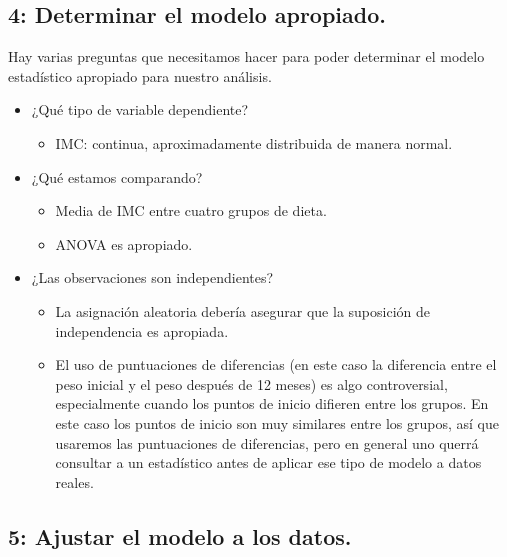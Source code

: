 \documentclass[
  12pt,
]{book}
\providecommand{\tightlist}{%
  \setlength{\itemsep}{0pt}\setlength{\parskip}{0pt}}
\theoremstyle{definition}
\theoremstyle{definition}
\theoremstyle{definition}
\theoremstyle{remark}
\begin{document}
\hypertarget{determinar-el-modelo-apropiado.}{%
\subsection{4: Determinar el modelo apropiado.}\label{determinar-el-modelo-apropiado.}}

Hay varias preguntas que necesitamos hacer para poder determinar el modelo estadístico apropiado para nuestro análisis.

\begin{itemize}
\tightlist
\item
  ¿Qué tipo de variable dependiente?

  \begin{itemize}
  \tightlist
  \item
    IMC: continua, aproximadamente distribuida de manera normal.
  \end{itemize}
\item
  ¿Qué estamos comparando?

  \begin{itemize}
  \tightlist
  \item
    Media de IMC entre cuatro grupos de dieta.
  \item
    ANOVA es apropiado.
  \end{itemize}
\item
  ¿Las observaciones son independientes?

  \begin{itemize}
  \tightlist
  \item
    La asignación aleatoria debería asegurar que la suposición de independencia es apropiada.
  \item
    El uso de puntuaciones de diferencias (en este caso la diferencia entre el peso inicial y el peso después de 12 meses) es algo controversial, especialmente cuando los puntos de inicio difieren entre los grupos. En este caso los puntos de inicio son muy similares entre los grupos, así que usaremos las puntuaciones de diferencias, pero en general uno querrá consultar a un estadístico antes de aplicar ese tipo de modelo a datos reales.
  \end{itemize}
\end{itemize}

\hypertarget{ajustar-el-modelo-a-los-datos.}{%
\subsection{5: Ajustar el modelo a los datos.}\label{ajustar-el-modelo-a-los-datos.}}
\end{document}
